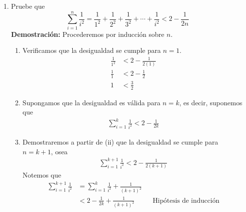 \documentclass[11pt]{article}
\begin{document}
\begin{enumerate}
 \item Pruebe que \[\sum_{i=1}^n \frac{1}{i^2} = \frac{1}{1^2}+\frac{1}{2^2}+\frac{1}{3^2}+\cdots + \frac{1}{i^2} < 2-\frac{1}{2n}\]
 \textbf{Demostración:} Procederemos por inducción sobre $n$. \begin{enumerate}[label=\roman*)]
  \item Verificamos que la desigualdad se cumple para $n=1$. \begin{align*}
   \frac{1}{1^2} &< 2 - \frac{1}{2(1)}\\
   \frac{1}{1} &< 2-\frac{1}{2}\\
   1 &< \frac{3}{2}
  \end{align*}
  \item Supongamos que la desigualdad es válida para $n=k$, es decir, suponemos que \begin{align*}
   \sum_{i=1}^k \frac{1}{i^2} < 2-\frac{1}{2k}
  \end{align*}
  \item Demostraremos a partir de (ii) que la desigualdad se cumple para $n=k+1$, osea \begin{align*}
   \sum_{i=1}^{k+1} \frac{1}{i^2} < 2-\frac{1}{2(k+1)}
  \end{align*} Notemos que \begin{align*}
   \sum_{i=1}^{k+1} \frac{1}{i^2} &= \sum_{i=1}^k \frac{1}{i^2} + \frac{1}{(k+1)^2}\\
   &< 2-\frac{1}{2k} + \frac{1}{(k+1)^2} && \text{Hipótesis	de inducción}\\
  \end{align*}
 \end{enumerate}

\end{enumerate}
\end{document}
